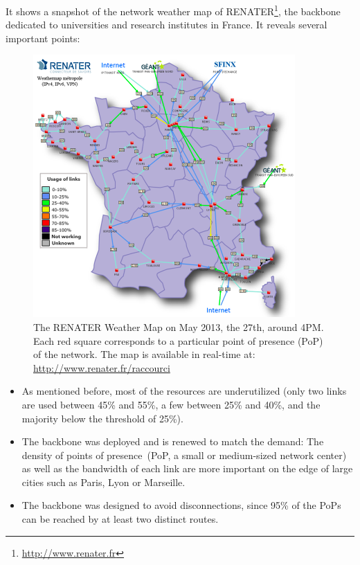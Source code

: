 It shows a snapshot of the network weather map of
RENATER\footnote{\href{http://www.renater.fr}{http://www.renater.fr}}, the backbone
dedicated to universities and research institutes in France. It reveals several
important points:
\begin{figure}[b]
\vspace*{-.3cm}
\includegraphics[width=10cm]{./FIGS/renater.png}
\centering\caption{The RENATER Weather Map on May 2013, the 27th, around 4PM.
Each red square corresponds to a particular point of presence (PoP) of the network. The map is available in real-time
at: \href{http://www.renater.fr/raccourci}{http://www.renater.fr/raccourci}}
\label{fig:renater}
\vspace*{-.3cm}
\end{figure}



\begin{itemize} 
\item As mentioned before, most of the resources are underutilized (only two links are used
  between 45\% and 55\%, a few between 25\% and 40\%, and the majority below the threshold
  of 25\%).
\item The backbone was deployed and is renewed to match the demand: The density of points
  of presence~(PoP, \ie a small or medium-sized network center) as well as the bandwidth
  of each link are more important on the edge of large cities such as Paris, Lyon or
  Marseille.
\item The backbone was designed to avoid disconnections, since 95\% of the PoPs can be
  reached by at least two distinct routes.
\end{itemize}


